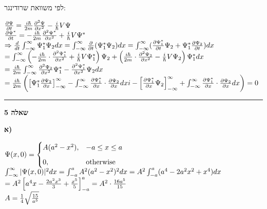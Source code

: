\documentclass[14pt]{extarticle}
\makeatletter
\newenvironment{lefteqs}{%
    \begin{english}%
    \begin{flushleft}%
    \renewcommand{\arraystretch}{1.3}%
    $\begin{array}{@{}l@{}}%
}{%
    \end{array}$%
    \end{flushleft}%
    \end{english}%
}
\makeatother
\begin{document}
לפי משוואת  שרודינגר:
\begin{lefteqs}
    \frac{\partial \Psi}{\partial t} = \frac{i\hbar}{2m} \frac{\partial^2 \Psi}{\partial x^2} -\frac{i}{\hbar} V \Psi \\
    \frac{\partial \Psi^*}{\partial t} = -\frac{i\hbar}{2m} \frac{\partial^2 \Psi^*}{\partial x^2} + \frac{i}{\hbar} V \Psi^* \\
    \Rightarrow \frac{d}{dt} \int_{-\infty}^{\infty} \Psi_{1}^* \Psi_{2} dx = \int_{-\infty}^{\infty} \frac{\partial}{\partial t} (\Psi_{1}^* \Psi_{2}) dx  =  \int_{-\infty}^{\infty} (\frac{\partial  \Psi_{1}^*}{\partial t}\Psi_{2} + \Psi_{1}^* \frac{\partial \Psi_{2}}{\partial t}) dx \\
    = \int_{-\infty}^{\infty} \left( -\frac{i\hbar}{2m}\cdot \frac{\partial^2 \Psi_{1}^*}{\partial x^2} + \frac{i}{\hbar}V\Psi_{1}^* \right)\Psi_{2} + \left( \frac{i\hbar}{2m} \cdot  \frac{\partial^2 \Psi_{2}}{\partial x^2} - \frac{i}{\hbar} V \Psi_{2} \right) \Psi_{1}^* dx \\
    = \frac{i\hbar}{2m} \int_{-\infty}^{\infty} \frac{\partial^2 \Psi_{2}}{\partial x^2} \Psi_{1}^* - \frac{\partial^2 \Psi_{1}^*}{\partial x^2} \Psi_{2} dx \\
    = \frac{i\hbar}{2m} \left( \left[ \Psi_{1}^*\frac{\partial \Psi_2}{\partial x} \right]_{-\infty}^{\infty}  
    - \int_{-\infty}^{\infty} \frac{\partial \Psi_{1}^*}{\partial x} \cdot \frac{\partial \Psi_2}{\partial x} dxi  - \left[ \frac{\partial \Psi_{1}^*}{\partial x} \Psi_2 \right]_{-\infty}^{\infty} + \int_{-\infty}^{\infty} \frac{\partial \Psi_{1}^*}{\partial x} \cdot \frac{\partial \Psi_2}{\partial x} dx \right) = 0   
\end{lefteqs}

\vspace{3em}
\hrule
\vspace{2em}

\textbf{\large שאלה 5}

\textbf{א)}
\begin{lefteqs}
    \Psi(x,0) = \begin{cases}
        A(a^2 - x^2), & -a \le x \le a    \\[6pt]
        0,            & \text{otherwise}
    \end{cases} \\
    \int_{-\infty}^{\infty} | \Psi(x,0)|^2 dx = \int_{-a}^{a} A^2 (a^2 - x^2)^2 dx = A^2 \int_{-a}^{a} (a^4 - 2a^2x^2 + x^4) dx \\
    = A^2 \left[ a^4x - \frac{2a^2x^3}{3} + \frac{x^5}{5} \right]_{-a}^{a} = A^2 \cdot \frac{16 a^5}{15} \\
    A = \frac{1}{4}\sqrt{\frac{15}{a^5}}
\end{lefteqs}
\end{document}

